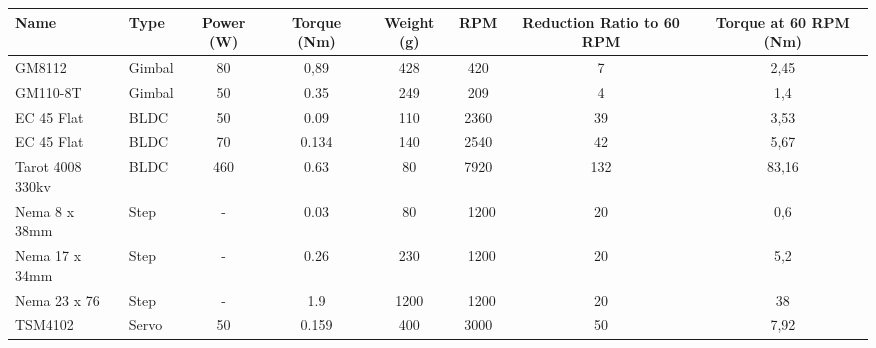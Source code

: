 \begin{table}[H]
\begin{adjustbox}{width={\textwidth}}
		\fontsize{14pt}{12pt}\selectfont
		\begin{tabular}{|l|l|c|c|c|c|c|c|}
			\hline
			\textbf{Name}    & \textbf{Type} & \textbf{Power (W)} & \textbf{Torque (Nm)} & \textbf{Weight (g)} & \textbf{RPM} & \textbf{Reduction Ratio to 60 RPM} & \textbf{Torque at 60 RPM (Nm)} \\ \hline
			GM8112           & Gimbal        & 80                 & 0,89                 & 428                 & 420          & 7                                  & 2,45                           \\
			GM110-8T         & Gimbal        & 50                 & 0.35                 & 249                 & 209          & 4                                  & 1,4                            \\
			EC 45 Flat       & BLDC          & 50                 & 0.09                 & 110                 & 2360         & 39                                 & 3,53                           \\
			EC 45 Flat       & BLDC          & 70                 & 0.134                & 140                 & 2540         & 42                                 & 5,67                           \\
			Tarot 4008 330kv & BLDC          & 460                & 0.63                 & 80                  & 7920         & 132                                & 83,16                          \\
			Nema 8 x 38mm    & Step          & -                  & 0.03                 & 80                  & ~1200        & 20                                 & 0,6                            \\
			Nema 17 x 34mm   & Step          & -                  & 0.26                 & 230                 & ~1200        & 20                                 & 5,2                            \\
			Nema 23 x 76     & Step          & -                  & 1.9                  & 1200                & ~1200        & 20                                 & 38                             \\
			TSM4102          & Servo         & 50                 & 0.159                & 400                 & 3000         & 50                                 & 7,92                           \\ \hline
		\end{tabular}
	\end{adjustbox}

\end{table}


